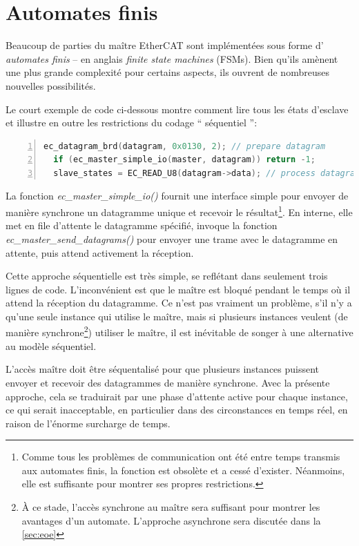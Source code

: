 \documentclass[a4paper,12pt,BCOR=6mm,bibtotoc,idxtotoc]{scrbook}
\begin{document}
\chapter{Automates finis}
\label{sec:fsm}

Beaucoup de parties du ma\^itre EtherCAT sont impl\'ement\'ees sous
forme d' \textit{automates finis} -- en anglais \textit{finite state
  machines} (FSMs). Bien
qu'ils am\`enent une plus grande complexit\'e pour certains aspects,
ils ouvrent de nombreuses nouvelles possibilit\'es.

Le court exemple de code ci-dessous montre comment lire tous les \'etats
d'esclave et illustre en outre les restrictions du codage ``
s\'equentiel '':


\begin{lstlisting}[gobble=2,language=C,numbers=left]
  ec_datagram_brd(datagram, 0x0130, 2); // prepare datagram
  if (ec_master_simple_io(master, datagram)) return -1;
  slave_states = EC_READ_U8(datagram->data); // process datagram
\end{lstlisting}

La fonction \textit{ec\_master\_simple\_io()} fournit une interface
simple pour envoyer de mani\`ere synchrone un datagramme unique et
recevoir le r\'esultat\footnote{ Comme tous les probl\`emes de
  communication ont \'et\'e entre temps transmis aux automates finis,
  la fonction est obsol\`ete et a cess\'e d'exister. N\'eanmoins, elle
  est suffisante pour montrer ses propres restrictions. }.  En
interne, elle met en file d'attente le datagramme sp\'ecifi\'e,
invoque la fonction \textit{ec\_master\_send\_datagrams()} pour
envoyer une trame avec le datagramme en attente, puis attend
activement la r\'eception.

Cette approche s\'equentielle est tr\`es simple, se refl\'etant dans
seulement trois lignes de code.  L'inconv\'enient est que le ma\^itre
est bloqu\'e pendant le temps o\`u il attend la r\'eception du
datagramme.  Ce n'est pas vraiment un probl\`eme, s'il n'y a qu'une
seule instance qui utilise le ma\^itre, mais si plusieurs instances
veulent (de mani\`ere synchrone\footnote{ \`A ce stade, l'acc\`es
  synchrone au ma\^itre sera suffisant pour montrer les avantages
  d'un automate. L'approche asynchrone sera discut\'ee dans la
  \autoref{sec:eoe}}) utiliser le ma\^itre, il est in\'evitable de
songer \`a une alternative au mod\`ele s\'equentiel.

L'acc\`es ma\^itre doit \^etre s\'equentalis\'e pour que plusieurs
instances puissent envoyer et recevoir des datagrammes de mani\`ere
synchrone. Avec la pr\'esente approche, cela se traduirait par une
phase d'attente active pour chaque instance, ce qui serait
inacceptable, en particulier dans des circonstances en temps r\'eel,
en raison de l'\'enorme surcharge de temps.
\end{document}
